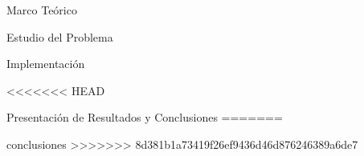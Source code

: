 \documentclass[a4paper,12pt]{report}
\begin{document}
\maketitle{}

\newpage
\tableofcontents{}

\newpage
\listoffigures{}

\newpage
\listoftables{}


\newpage
\begin{part}{Marco Teórico}
\newpage
\newpage
\end{part}
\begin{part}{Estudio del Problema}
\newpage
\newpage
\newpage

\newpage
\newpage
%
\end{part}
\begin{part}{Implementación}
\newpage
\newpage
\end{part}
<<<<<<< HEAD
\begin{part}{Presentación de Resultados y Conclusiones}
=======
\begin{part}{conclusiones}
\newpage
>>>>>>> 8d381b1a73419f26ef9436d46d876246389a6de7

\newpage
\end{part}
\newpage
%
\end{part}
\end{document}
